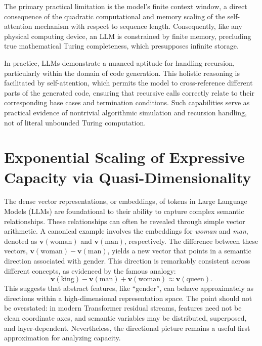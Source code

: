 \documentclass[%
  reprint,
  superscriptaddress,
  showpacs,
  showkeys,
  amsmath,amssymb,
  pra,
  longbibliography,
  floatfix,
  x11names
]{revtex4-2}
\begin{document}
The primary practical limitation is the model's finite context window, a direct consequence of the quadratic computational and memory scaling of the self-attention mechanism with respect to sequence length. Consequently, like any physical computing device, an LLM is constrained by finite memory, precluding true mathematical Turing completeness, which presupposes infinite storage.

In practice, LLMs demonstrate a nuanced aptitude for handling recursion, particularly within the domain of code generation. This holistic reasoning is facilitated by self-attention, which permits the model to cross-reference different parts of the generated code, ensuring that recursive calls correctly relate to their corresponding base cases and termination conditions. Such capabilities serve as practical evidence of nontrivial algorithmic simulation and recursion handling, not of literal unbounded Turing computation.





\section{Exponential Scaling of Expressive Capacity via Quasi-Dimensionality}
\label{section:ExpScal}

The dense vector representations, or embeddings, of tokens in Large Language Models (LLMs) are foundational
to their ability to capture complex semantic relationships. These relationships can often be revealed through simple vector arithmetic.
A canonical example involves the embeddings for \textit{woman} and \textit{man},
denoted as $\bm{v}(\text{woman})$ and $\bm{v}(\text{man})$, respectively.
The difference between these vectors, $\bm{v}(\text{woman}) - \bm{v}(\text{man})$,
yields a new vector that points in a semantic direction associated with gender.
This direction is remarkably consistent across different concepts, as evidenced by the famous analogy:
\begin{equation}
    \bm{v}(\text{king}) - \bm{v}(\text{man}) + \bm{v}(\text{woman}) \approx \bm{v}(\text{queen}).
\end{equation}
This suggests that abstract features, like ``gender'', can behave approximately as directions within a high-dimensional representation space.
The point should not be overstated: in modern Transformer residual streams, features need not be clean coordinate axes, and semantic variables may be distributed, superposed, and layer-dependent.  Nevertheless, the directional picture remains a useful first approximation for analyzing capacity.
\end{document}
